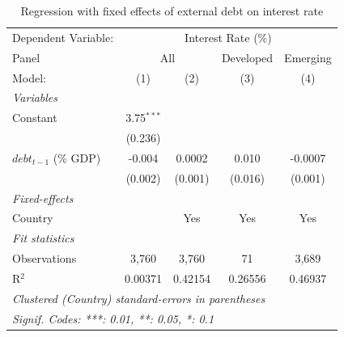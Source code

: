 
\begin{table}[H]
   \caption{\label{tab:q1} Regression with fixed effects of external debt on interest rate}
   \centering
   \begin{tabular}{lcccc}
      \tabularnewline \midrule \midrule
      Dependent Variable: & \multicolumn{4}{c}{Interest Rate (\%)}\\
      Panel & \multicolumn{2}{c}{All} & Developed & Emerging \\ 
      Model:                 & (1)          & (2)     & (3)     & (4)\\  
      \midrule
      \emph{Variables}\\
      Constant               & 3.75$^{***}$ &         &         &   \\   
                             & (0.236)      &         &         &   \\   
      $debt_{t-1}$ (\% GDP)  & -0.004       & 0.0002  & 0.010   & -0.0007\\   
                             & (0.002)      & (0.001) & (0.016) & (0.001)\\   
      \midrule
      \emph{Fixed-effects}\\
      Country                &              & Yes     & Yes     & Yes\\  
      \midrule
      \emph{Fit statistics}\\
      Observations           & 3,760        & 3,760   & 71      & 3,689\\  
      R$^2$                  & 0.00371      & 0.42154 & 0.26556 & 0.46937\\  
      \midrule \midrule
      \multicolumn{5}{l}{\emph{Clustered (Country) standard-errors in parentheses}}\\
      \multicolumn{5}{l}{\emph{Signif. Codes: ***: 0.01, **: 0.05, *: 0.1}}\\
   \end{tabular}
\end{table}


